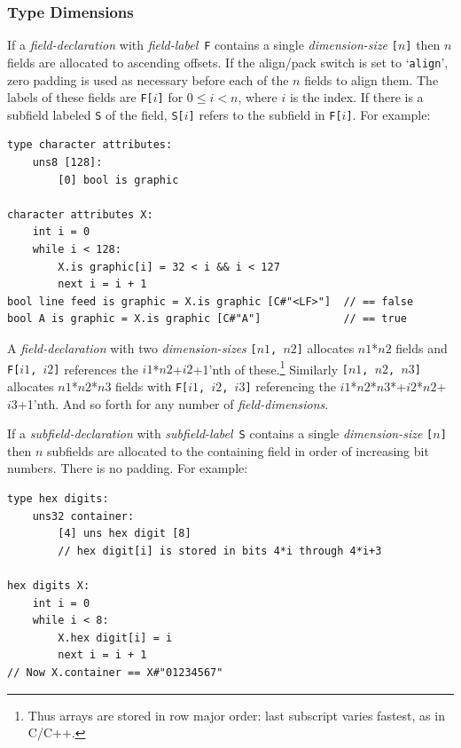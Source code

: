 \documentclass[12pt]{article}
\newenvironment{indpar}[1][0.3in]%
	{\begin{list}{}%
		     {\setlength{\itemsep}{0in}%
		      \setlength{\topsep}{0in}%
		      \setlength{\parsep}{1ex}%
		      \setlength{\labelwidth}{#1}%
		      \setlength{\leftmargin}{#1}%
		      \addtolength{\leftmargin}{\labelsep}}%
	 \item}%
	{\end{list}}
\begin{document}
\subsubsection{Type Dimensions}

If a {\em field-declaration} with {\em field-label}\, {\tt F} contains
a single {\em dimension-size} {\tt [$n$]} then $n$ fields are
allocated to ascending offsets.  If the align/pack switch is set to
`{\tt align}', zero padding is used as necessary before each of the
$n$ fields to align them.
The labels of these
fields are {\tt F[$i$]} for $0\le i<n$, where $i$ is the index.
If there is a subfield
labeled {\tt S} of the field, {\tt S[$i$]} refers to the
subfield in {\tt F[$i$]}.  For example:

\begin{indpar}\begin{verbatim}
type character attributes:
    uns8 [128]:
        [0] bool is graphic

character attributes X:
    int i = 0
    while i < 128:
        X.is graphic[i] = 32 < i && i < 127
        next i = i + 1
bool line feed is graphic = X.is graphic [C#"<LF>"]  // == false
bool A is graphic = X.is graphic [C#"A"]             // == true
\end{verbatim}\end{indpar}

A {\em field-declaration} with two {\em dimension-sizes}
{\tt [$n1$, $n2$]} allocates $n1$*$n2$ fields and
{\tt F[$i1$, $i2$]} references the $i1$*$n2$+$i2$+1'nth
of these.\footnote{Thus arrays are stored in
row major order: last subscript varies fastest, as in C/C++.}
Similarly
{\tt [$n1$, $n2$, $n3$]} allocates $n1$*$n2$*$n3$ fields with
{\tt F[$i1$, $i2$, $i3$]} referencing the
$i1$*$n2$*$n3$*+$i2$*$n2$+$i3$+1'nth.  And so forth for any
number of {\em field-dimensions}.

If a {\em subfield-declaration} with {\em subfield-label}\, {\tt S} contains
a single {\em dimension-size} {\tt [$n$]} then $n$ subfields are
allocated to the containing field in order of increasing bit numbers.
There is no padding.
For example:

\begin{indpar}\begin{verbatim}
type hex digits:
    uns32 container:
        [4] uns hex digit [8]
        // hex digit[i] is stored in bits 4*i through 4*i+3

hex digits X:
    int i = 0
    while i < 8:
        X.hex digit[i] = i
        next i = i + 1
// Now X.container == X#"01234567"
\end{verbatim}\end{indpar}
\end{document}
